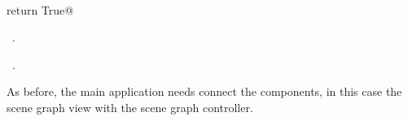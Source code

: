 \documentclass[
    a4paper,      %
    10pt,         %
    openright,    %
    notitlepage,  %
    parskip=half, %
]{scrreprt}       %
\theoremstyle{definition}                    %
\begin{document}
\begin{flushleft}
\begin{minipage}{\linewidth}
\begin{list}{}{}
\mbox{}\lstinline@@\\
\mbox{}\lstinline@    return True@\\
\mbox{}\lstinline@@{\NWsep}
\end{list}
\vspace{-1.5ex}
\footnotesize
\begin{list}{}{\setlength{\itemsep}{-\parsep}\setlength{\itemindent}{-\leftmargin}}
\item \NWtxtMacroDefBy\ .
\item \NWtxtMacroRefIn\ .

\item{}
\end{list}
\end{minipage}\vspace{4ex}
\end{flushleft}
As before, the main application needs connect the components, in this case the
scene graph view with the scene graph controller.
\end{document}
